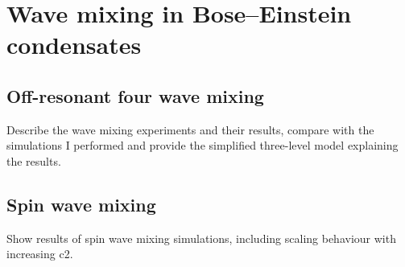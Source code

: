 \chapter{Wave mixing in Bose–Einstein condensates}

    \section{Off-resonant four wave mixing}
    Describe the wave mixing experiments and their results, compare with the simulations I performed and provide the simplified three-level model explaining the results.

    \section{Spin wave mixing}
    Show results of spin wave mixing simulations, including scaling behaviour with increasing c2.
